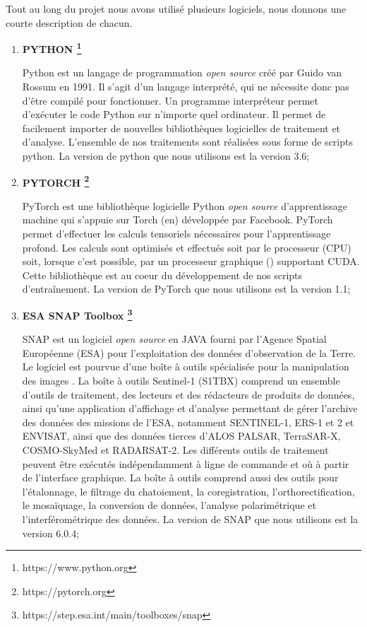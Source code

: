 Tout au long du projet nous avons utilisé plusieurs logiciels, nous donnons une courte description de chacun.

\begin{enumerate}
    \item \textbf{PYTHON \footnote{https://www.python.org}}
    
     Python est un langage de programmation \textit{open source} créé par Guido van Rossum en 1991. Il s’agit d’un langage interprété, qui ne nécessite donc pas d’être compilé pour fonctionner. Un programme   interpréteur permet d’exécuter le code Python sur n’importe quel ordinateur. Il permet de facilement importer de nouvelles bibliothèques logicielles de traitement et d'analyse.  L'ensemble de nos traitements sont réalisées sous forme de scripts python. La version de python que nous utilisons est la version 3.6;
     
     \item \textbf{PYTORCH \footnote{https://pytorch.org}}
     
     PyTorch est une bibliothèque logicielle Python \textit{open source} d'apprentissage machine qui s'appuie sur Torch (en) développée par Facebook. PyTorch permet d'effectuer les calculs tensoriels nécessaires pour l'apprentissage profond. Les calculs sont optimisés et effectués soit par le processeur (CPU) soit, lorsque c'est possible, par un processeur graphique (\acrgpuns) supportant CUDA. 
     Cette bibliothèque est au coeur du développement de nos scripts d'entraînement. La version de PyTorch que nous utilisons est la version 1.1;

    \item \textbf{ESA SNAP Toolbox \footnote{https://step.esa.int/main/toolboxes/snap}}
    
    SNAP est un logiciel \textit{open source} en JAVA fourni par l'Agence Spatial Européenne (ESA) pour l'exploitation des données d'observation de la Terre. Le logiciel est pourvue d'une boîte à outils spécialisée pour la manipulation des images \acrpolsarns. La boîte à outils Sentinel-1 (S1TBX) comprend un ensemble d’outils de traitement, des lecteurs et des rédacteurs de produits de données, ainsi qu’une application d’affichage et d’analyse permettant de gérer l’archive des données des missions \acrsar de l’ESA, notamment SENTINEL-1, ERS-1 et 2 et ENVISAT, ainsi que des données \acrsar tierces d’ALOS PALSAR, TerraSAR-X, COSMO-SkyMed et RADARSAT-2. Les différents outils de traitement peuvent être exécutés indépendamment à ligne de commande et où à partir de l'interface graphique. La boîte à outils comprend aussi des outils pour l’étalonnage, le filtrage du chatoiement, la coregistration, l’orthorectification, le mosaïquage, la conversion de données, l'analyse polarimétrique et l’interférométrique des données.  La version de SNAP que nous utilisons est la version 6.0.4;
    

\end{enumerate}
